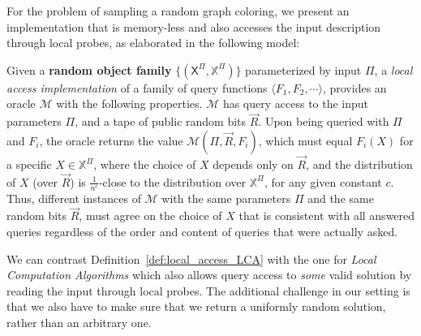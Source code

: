 
For the problem of sampling a random graph coloring,
we present an implementation that is memory-less and also accesses the input description through local probes,
as elaborated in the following model:

\begin{definition}
\label{def:local_access_LCA}
Given a \textbf{random object family} $\{(\mathsf X^{\Pi}, \mathbb X^{\Pi})\}$ parameterized by input $\Pi$,
a \emph{local access implementation} of a family of query functions $\langle F_1, F_2,\cdots \rangle$,
provides an oracle $\mathcal M$ with the following properties.
$\mathcal M$ has query access to the input parameters $\Pi$, and a tape of public random bits $\vec R$.
Upon being queried with $\Pi$ and $F_i$, the oracle returns the value $\mathcal M(\Pi,\vec R,F_i)$,
which must equal $F_i(X)$ for a specific $X\in\mathbb X^{\Pi}$, where the choice of $X$ depends only on $\vec R$,
and the distribution of $X$ (over $\vec R$) is $\frac1{n^c}$-close to the distribution over $\mathbb X^{\Pi}$, for any given constant $c$.
Thus, different instances of $\mathcal M$ with the same parameters $\Pi$ and the same random bits $\vec R$,
must agree on the choice of $X$ that is consistent with all answered queries regardless of the order and content of queries that were actually asked.
\end{definition}

We can contrast Definition~\ref{def:local_access_LCA} with the one for \emph{Local Computation Algorithms} \cite{LCA, LCA_space_efficient}
which also allows query access to \emph{some} valid solution by reading the input through local probes.
The additional challenge in our setting is that we also have to make sure that we return a uniformly random solution, rather than an arbitrary one.

